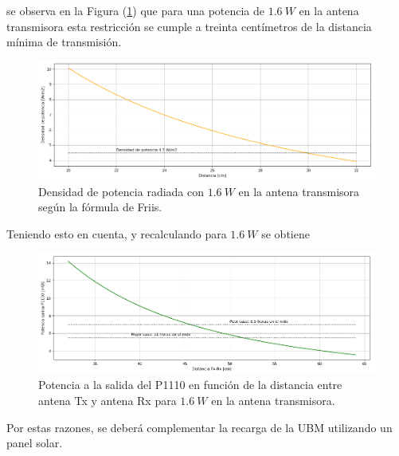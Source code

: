 se observa en la Figura (\ref{fig:densidadradiada}) que para una potencia de $1.6 \ W$ en la antena transmisora esta restricción se cumple a treinta centímetros de la distancia mínima de transmisión.

\begin{figure}[H]
	\centering
	\includegraphics[width=\linewidth]{ImagenesFactibilidad/densidadradiada}
	\caption{Densidad de potencia radiada con $1.6 \ W$ en la antena transmisora según la fórmula de Friis.}
	\label{fig:densidadradiada}
\end{figure}

Teniendo esto en cuenta, y recalculando para $1.6 \ W$ se obtiene

\begin{figure}[H]
	\centering
	\includegraphics[width=\linewidth]{ImagenesFactibilidad/recalculo}
	\caption{Potencia a la salida del P1110 en función de la distancia entre antena Tx y antena Rx para $1.6 \ W$ en la antena transmisora.}
	\label{fig:recalculo}
\end{figure}

Por estas razones, se deberá complementar la recarga de la UBM utilizando un panel solar.

